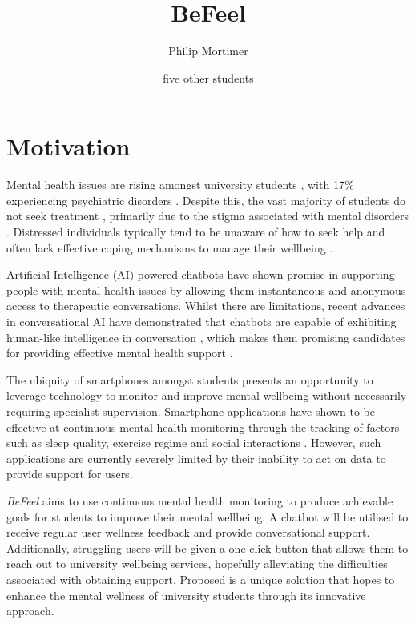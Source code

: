 \documentclass[acmsmall, screen, nonacm, 9pt, a4paper,top=2cm,bottom=2cm,left=1cm,right=1cm, marginparwidth=1cm]{acmart}
\title{BeFeel}
\author{Philip Mortimer}
\author{five other students}
\begin{document}
\maketitle
\pagestyle{plain}


\section{Motivation}
Mental health issues are rising amongst university students \cite{Storrie2010AProblem}, with 17\% experiencing psychiatric disorders \cite{Macaskill2013TheKingdom}. Despite this, the vast majority of students do not seek treatment \cite{Macaskill2013TheKingdom,Blanco2008MentalPeers}, primarily due to the stigma associated with mental disorders \cite{MichaelN.Sharpe2004TheEducation}. Distressed individuals typically tend to be unaware of how to seek help and often lack effective coping mechanisms to manage their wellbeing \cite{Rosenthal2008MentalStudents}.

Artificial Intelligence (AI) powered chatbots have shown promise in supporting people with mental health issues by allowing them instantaneous and anonymous access to therapeutic conversations\cite{Grove2021Co-developingPeople}. Whilst there are limitations, recent advances in conversational AI have demonstrated that chatbots are capable of exhibiting human-like intelligence in conversation \cite{Bubeck2023SparksGPT-4}, which makes them promising candidates for providing effective mental health support \cite{Pham2022ArtificialPsychiatry}.

The ubiquity of smartphones amongst students \cite{OfcomSmartphoneStatista} presents an opportunity to leverage technology to monitor and improve mental wellbeing without necessarily requiring specialist supervision. Smartphone applications have shown to be effective at continuous mental health monitoring through the tracking of factors such as sleep quality, exercise regime and social interactions \cite{Wang2014StudentLife,Wang2022First-GenLens}. However, such applications are currently severely limited by their inability to act on data to provide support for users.

\emph{BeFeel} aims to use continuous mental health monitoring to produce achievable goals for students to improve their mental wellbeing. A chatbot will be utilised to receive regular user wellness feedback and provide conversational support. Additionally, struggling users will be given a one-click button that allows them to reach out to university wellbeing services, hopefully alleviating the difficulties associated with obtaining support. Proposed is a unique solution that hopes to enhance the mental wellness of university students through its innovative approach.
\end{document}
